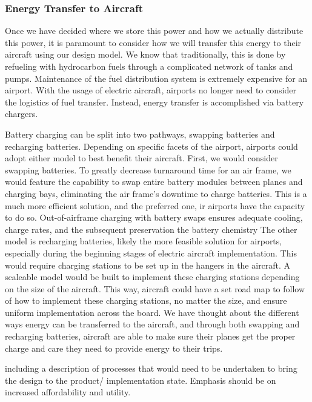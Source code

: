 \documentclass[../main.tex]{subfiles}
\begin{document}
\subsubsection{Energy Transfer to Aircraft} %
Once we have decided where we store this power and how we actually distribute this power, it is paramount to consider how we will transfer this energy to their aircraft using our design model. We know that traditionally, this is done by refueling with hydrocarbon fuels through a complicated network of tanks and pumps. Maintenance of the fuel distribution system is extremely expensive for an airport. With the usage of electric aircraft, airports no longer need to consider the logistics of fuel transfer. Instead, energy transfer is accomplished via battery chargers.\par
Battery charging can be split into two pathways, swapping batteries and recharging batteries. Depending on specific facets of the airport, airports could adopt either model to best benefit their aircraft. First, we would consider swapping batteries. To greatly decrease turnaround time for an air frame, we would feature the capability to swap entire battery modules between planes and charging bays, eliminating the air frame’s downtime to charge batteries. This is a much more efficient solution, and the preferred one, ir airports have the capacity to do so. Out-of-airframe charging with battery swaps ensures adequate cooling, charge rates, and the subsequent preservation the battery chemistry  
The other model is recharging batteries, likely the more feasible solution for airports, especially during the beginning stages of electric aircraft implementation. This would require charging stations to be set up in the hangers in the aircraft. A scaleable model would be built to implement these charging stations depending on the size of the aircraft. This way, aircraft could have a set road map to follow of how to implement these charging stations, no matter the size, and ensure uniform implementation across the board. 
We have thought about the different ways energy can be transferred to the aircraft, and through both swapping and recharging batteries, aircraft are able to make sure their planes get the proper charge and care they need to provide energy to their trips. 

 including a description of processes that would need to be undertaken to bring the design to the product/ implementation state. Emphasis should be on increased affordability and utility.
\end{document}
